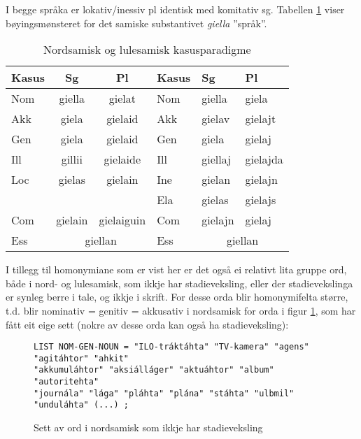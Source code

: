\documentclass[a4paper,norsk]{article}
\begin{document}
I begge språka er lokativ/inessiv pl identisk med komitativ sg. Tabellen \ref{smecas}  viser bøyingsmønsteret for det samiske substantivet \emph{giella} ''språk''.%

\begin{table}[htdp]
\caption{Nordsamisk  og lulesamisk kasusparadigme}
\begin{center}
\begin{tabular}{|l|c|c||l|l|l|}
\hline
Kasus  & Sg & Pl & Kasus & Sg & Pl \\
\hline
Nom & giella & gielat & Nom & giella & giela \\
\hline
Akk & giela & gielaid & Akk & gielav & gielajt \\\cline{1-1}
Gen & giela & gielaid & Gen & giela & gielaj \\
\hline
Ill & gillii & gielaide & Ill & giellaj & gielajda \\
\hline
Loc & gielas & gielain & Ine & gielan & gielajn \\
\hline
    &        &         & Ela & gielas & gielajs \\
\hline
Com & gielain & gielaiguin & Com & gielajn & gielaj \\

\hline
Ess & \multicolumn{2}{c|}{giellan}  & Ess & \multicolumn{2}{c|}{giellan}  \\
\hline
\end{tabular}
\end{center}
\label{smecas}
\end{table}%

I tillegg til homonymiane som er vist her er det også ei relativt lita gruppe ord, både i nord- og lulesamisk, som ikkje har stadieveksling, eller der stadievekslinga er synleg berre i tale, og ikkje i skrift. For desse orda blir homonymifelta større, t.d. blir nominativ = genitiv = akkusativ i nordsamisk for  orda i figur \ref{nomgenlist}, som har fått eit eige sett (nokre av desse orda kan også ha stadieveksling):%

\begin{figure}[htbp]
\begin{center}
\begin{verbatim}
LIST NOM-GEN-NOUN = "ILO-tráktáhta" "TV-kamera" "agens" "agitáhtor" "ahkit" 
"akkumuláhtor" "aksiálláger" "aktuáhtor" "album" "autoritehta"
"journála" "lága" "pláhta" "plána" "stáhta" "ulbmil" "unduláhta" (...) ;
\end{verbatim}
\caption{Sett av ord i nordsamisk som ikkje har stadieveksling}
\label{nomgenlist}
\end{center}
\end{figure}
\end{document}
